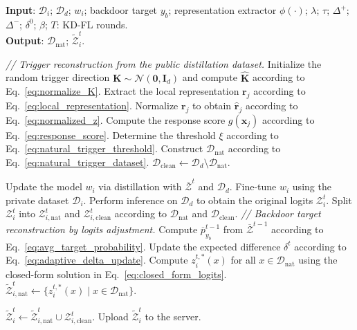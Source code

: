 \documentclass[lettersize,journal]{IEEEtran}
\newif\ifhighlight
\newcommand{\hlthree}[1]{%
    \ifhighlight{\color{reviewer3}#1}\else#1\fi
}
\begin{document}
\begin{algorithm}[t]
    \caption{A Complete Description of RTT}
    \label{Algorithm}
    \textbf{Input}: $\mathcal{D}_i$; $\mathcal{D}_d$; $w_{i}$; backdoor target $y_b$; representation extractor $\phi(\cdot)$; $\lambda$; $\tau$; $\Delta^{+}$; $\Delta^{-}$; $\delta^0$; $\beta$; $T$: KD-FL rounds.\\
    \textbf{Output}: \(\mathcal{D}_\mathrm{nat}\); \(\widetilde{\mathcal{Z}}_i^t\).
    \begin{algorithmic}[1]
        \STATE \textit{// Trigger reconstruction from the public distillation dataset.}
        \STATE Initialize the random trigger direction $\mathbf{K}\sim\mathcal{N}(\mathbf{0},\mathbf{I}_d)$ and compute $\hat{\mathbf{K}}$ according to Eq.~\ref{eq:normalize_K}.
            \STATE Extract the local representation $\mathbf{r}_j$ according to Eq.~\ref{eq:local_representation}.
            \STATE Normalize $\mathbf{r}_j$ to obtain $\hat{\mathbf{r}}_j$ according to Eq.~\ref{eq:normalized_z}.
            \STATE Compute the response score $g(\mathbf{x}_j)$ according to Eq.~\ref{eq:response_score}.
        \ENDFOR
        \STATE Determine the threshold $\xi$ according to Eq.~\ref{eq:natural_trigger_threshold}.
        \STATE Construct $\mathcal{D}_\mathrm{nat}$ according to Eq.~\ref{eq:natural_trigger_dataset}.
        \STATE $\mathcal{D}_\mathrm{clean}\leftarrow \mathcal{D}_d\setminus\mathcal{D}_\mathrm{nat}$.
        
            \STATE Update the model $w_i$ via distillation with $\overline{\mathcal{Z}}^{t}$ and $\mathcal{D}_d$.
            \STATE Fine-tune $w_i$ using the private dataset $\mathcal{D}_i$.
            \STATE Perform inference on $\mathcal{D}_d$ to obtain the original logits $\mathcal{Z}_i^t$.
            \STATE Split \(\mathcal{Z}_i^t\) into \(\mathcal{Z}_{i,\mathrm{nat}}^{t}\) and \(\mathcal{Z}_{i,\mathrm{clean}}^{t}\) according to \(\mathcal{D}_\mathrm{nat}\) and \(\mathcal{D}_\mathrm{clean}\).
            \STATE \textit{// Backdoor target reconstruction by logits adjustment.}
            \STATE Compute $\overline{p}^{t-1}_{y_b}$ from $\overline{\mathcal{Z}}^{t-1}$ according to Eq.~\ref{eq:avg_target_probability}.
            \STATE Update the expected difference $\delta^t$ according to Eq.~\ref{eq:adaptive_delta_update}.
            \STATE \hlthree{Compute $z_i^{t,*}(x)$ for all $x\in\mathcal{D}_{\mathrm{nat}}$ using the closed-form solution in Eq.~\ref{eq:closed_form_logits}.
            \STATE $\widetilde{\mathcal{Z}}_{i,\mathrm{nat}}^t \leftarrow\{z_i^{t,*}(x)\mid x\in\mathcal{D}_{\mathrm{nat}}\}$.}
            \STATE \(\widetilde{\mathcal{Z}}_i^t\leftarrow\widetilde{\mathcal{Z}}_{i,\mathrm{nat}}^t\cup\mathcal{Z}_{i,\mathrm{clean}}^t\).
            \STATE Upload \(\widetilde{\mathcal{Z}}_i^t\) to the server.
        \ENDFOR
    \end{algorithmic}
\end{algorithm}
\end{document}
